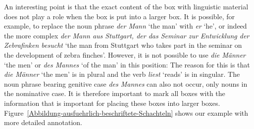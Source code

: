 An interesting point is that the exact content of the box with linguistic material does not play a
role when the box is put into a larger box. It is possible, for example, to replace
the noun phrase \emph{der Mann} `the man' with \emph{er} `he', or indeed the more complex \emph{der Mann aus Stuttgart, der das Seminar zur Entwicklung der Zebrafinken besucht} `the man from Stuttgart
who takes part in the seminar on the development of zebra finches'. However, it is not possible to use \emph{die Männer} `the men' or \emph{des Mannes} `of the man' in this position:
\eal 
{} 
\zl 
The reason for this is that \emph{die Männer} `the men' is in plural and the verb \emph{liest} `reads' is in singular. The noun phrase bearing genitive case \emph{des Mannes} can also
not occur, only nouns in the nominative case. It is therefore important to mark all boxes with the information that is important for placing these boxes into larger boxes.
Figure~\vref{Abbildung-ausfuehrlich-beschriftete-Schachteln} shows our example with more detailed annotation.

